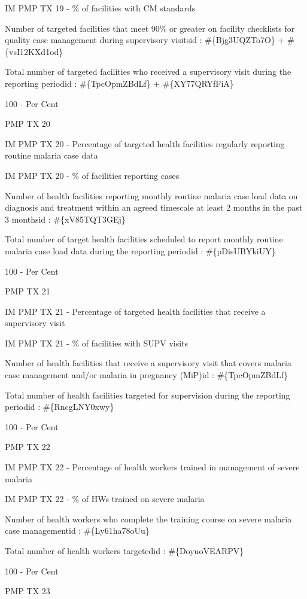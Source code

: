 \documentclass[]{book}
\begin{document}
IM PMP TX 19 - \% of facilities with CM standards

Number of targeted facilities that meet 90\% or greater on facility checklists for quality case management during supervisory visitsid : \#\{Bjg3UQZTo7O\} + \#\{vsI12KXd1od\}

Total number of targeted facilities who received a supervisory visit during the reporting periodid : \#\{TpcOpmZBdLf\} + \#\{XY77QRYfFiA\}

100 - Per Cent

PMP TX 20

IM PMP TX 20 - Percentage of targeted health facilities regularly reporting routine malaria case data

IM PMP TX 20 - \% of facilities reporting cases

Number of health facilities reporting monthly routine malaria case load data on diagnosis and treatment within an agreed timescale at least 2 months in the past 3 monthsid : \#\{xV85TQT3GEj\}

Total number of target health facilities scheduled to report monthly routine malaria case load data during the reporting periodid : \#\{pDisUBYkiUY\}

100 - Per Cent

PMP TX 21

IM PMP TX 21 - Percentage of targeted health facilities that receive a supervisory visit

IM PMP TX 21 - \% of facilities with SUPV visits

Number of health facilities that receive a supervisory visit that covers malaria case management and/or malaria in pregnancy (MiP)id : \#\{TpcOpmZBdLf\}

Total number of health facilities targeted for supervision during the reporting periodid : \#\{RncgLNY0xwy\}

100 - Per Cent

PMP TX 22

IM PMP TX 22 - Percentage of health workers trained in management of severe malaria

IM PMP TX 22 - \% of HWs trained on severe malaria

Number of health workers who complete the training course on severe malaria case managementid : \#\{Ly61ha78oUu\}

Total number of health workers targetedid : \#\{DoyuoVEARPV\}

100 - Per Cent

PMP TX 23
\end{document}
